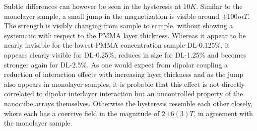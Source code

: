 \documentclass[\main/dresen_thesis.tex]{subfiles}
\begin{document}
  Subtle differences can however be seen in the hysteresis at $10 \unit{K}$.
  Similar to the monolayer sample, a small jump in the magnetization is visible around $\pm 100 \unit{mT}$.
  The strength is visibly changing from sample to sample, without showing a systematic with respect to the PMMA layer thickness.
  Whereas it appear to be nearly invisible for the lowest PMMA concentration sample DL-0.125\%, it appears clearly visible for DL-0.25\%, reduces in size for DL-1.25\% and becomes stronger again for DL-2.5\%.
  As one would expect from dipolar coupling a reduction of interaction effects with increasing layer thickness and as the jump also appears in monolayer samples, it is probable that this effect is not directly correlated to dipolar interlayer interaction but an uncontrolled property of the nanocube arrays themselves.
  Otherwise the hysteresis resemble each other closely, where each has a coercive field in the magnitude of $2.16(3) \unit{T}$, in agreement with the monolayer sample.

  

\end{document}
